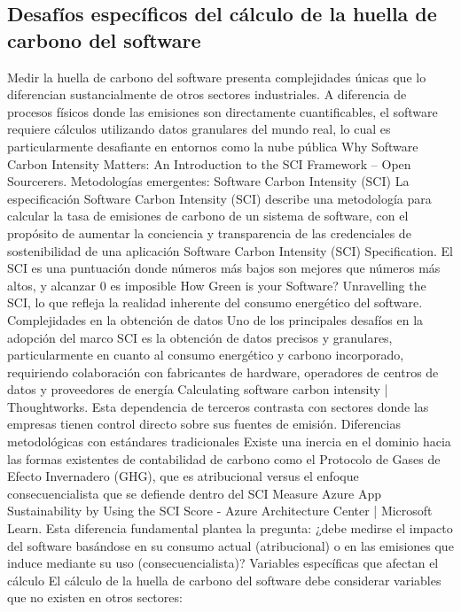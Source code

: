\documentclass[12pt,a4paper]{report}
\begin{document}
\subsection{Desafíos específicos del cálculo de la huella de carbono del software}
Medir la huella de carbono del software presenta complejidades únicas que lo diferencian sustancialmente de otros sectores industriales. A diferencia de procesos físicos donde las emisiones son directamente cuantificables, el software requiere cálculos utilizando datos granulares del mundo real, lo cual es particularmente desafiante en entornos como la nube pública Why Software Carbon Intensity Matters: An Introduction to the SCI Framework – Open Sourcerers.
Metodologías emergentes: Software Carbon Intensity (SCI)
La especificación Software Carbon Intensity (SCI) describe una metodología para calcular la tasa de emisiones de carbono de un sistema de software, con el propósito de aumentar la conciencia y transparencia de las credenciales de sostenibilidad de una aplicación Software Carbon Intensity (SCI) Specification. El SCI es una puntuación donde números más bajos son mejores que números más altos, y alcanzar 0 es imposible How Green is your Software? Unravelling the SCI, lo que refleja la realidad inherente del consumo energético del software.
Complejidades en la obtención de datos
Uno de los principales desafíos en la adopción del marco SCI es la obtención de datos precisos y granulares, particularmente en cuanto al consumo energético y carbono incorporado, requiriendo colaboración con fabricantes de hardware, operadores de centros de datos y proveedores de energía Calculating software carbon intensity | Thoughtworks. Esta dependencia de terceros contrasta con sectores donde las empresas tienen control directo sobre sus fuentes de emisión.
Diferencias metodológicas con estándares tradicionales
Existe una inercia en el dominio hacia las formas existentes de contabilidad de carbono como el Protocolo de Gases de Efecto Invernadero (GHG), que es atribucional versus el enfoque consecuencialista que se defiende dentro del SCI Measure Azure App Sustainability by Using the SCI Score - Azure Architecture Center | Microsoft Learn. Esta diferencia fundamental plantea la pregunta: ¿debe medirse el impacto del software basándose en su consumo actual (atribucional) o en las emisiones que induce mediante su uso (consecuencialista)?
Variables específicas que afectan el cálculo
El cálculo de la huella de carbono del software debe considerar variables que no existen en otros sectores:
\end{document}
